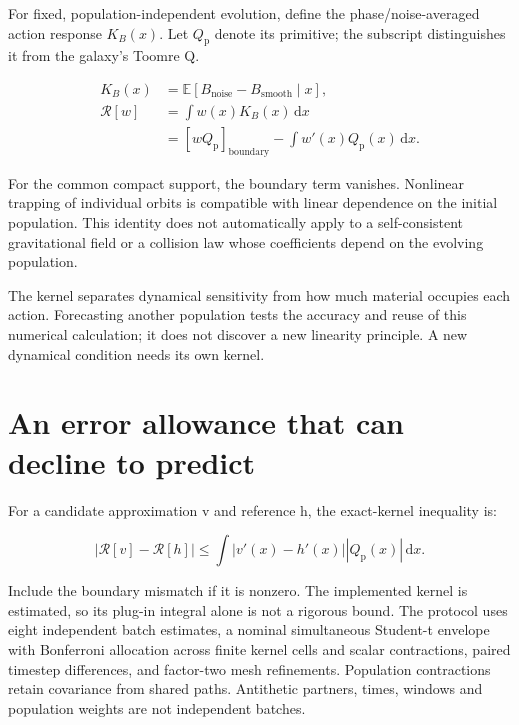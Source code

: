 \documentclass[fleqn,usenatbib]{mnras}
\begin{document}
For fixed, population-independent evolution, define the phase/noise-averaged action response \(K_B(x)\). Let \(Q_{\mathrm p}\) denote its primitive; the subscript distinguishes it from the galaxy's Toomre Q.

\begin{equation}\label{EQ-KER-01}
\begin{aligned}
K_B(x)&=\mathbb E[B_{\mathrm{noise}}-B_{\mathrm{smooth}}\mid x],\\
\mathcal R[w]&=\int w(x)K_B(x)\,\mathrm dx\\
&=[wQ_{\mathrm p}]_{\mathrm{boundary}}-\int w'(x)Q_{\mathrm p}(x)\,\mathrm dx.
\end{aligned}
\end{equation}

For the common compact support, the boundary term vanishes. Nonlinear trapping of individual orbits is compatible with linear dependence on the initial population. This identity does not automatically apply to a self-consistent gravitational field or a collision law whose coefficients depend on the evolving population.

The kernel separates dynamical sensitivity from how much material occupies each action. Forecasting another population tests the accuracy and reuse of this numerical calculation; it does not discover a new linearity principle. A new dynamical condition needs its own kernel.

\section{An error allowance that can decline to predict}\label{accuracy}

For a candidate approximation v and reference h, the exact-kernel inequality is:

\begin{equation}\label{EQ-ERR-01}
\left|\mathcal R[v]-\mathcal R[h]\right|
\leq \int\left|v'(x)-h'(x)\right|\left|Q_{\mathrm p}(x)\right|\,\mathrm dx.
\end{equation}

Include the boundary mismatch if it is nonzero. The implemented kernel is estimated, so its plug-in integral alone is not a rigorous bound. The protocol uses eight independent batch estimates, a nominal simultaneous Student-t envelope with Bonferroni allocation across finite kernel cells and scalar contractions, paired timestep differences, and factor-two mesh refinements. Population contractions retain covariance from shared paths. Antithetic partners, times, windows and population weights are not independent batches.
\end{document}

